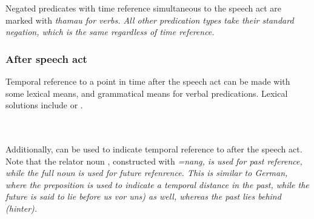 Negated predicates with time reference simultaneous to the speech act are marked with \em thamau\em{} for verbs. All other predication types take their standard negation, which is the same regardless of time reference.




\subsubsection{After speech act}\label{sec:func:Afterspeechact}
Temporal reference to a point in time after the speech act can be made with some lexical means, and grammatical means for verbal predications. Lexical solutions include  or .

 \\
 \\

Additionally,  can be used to indicate temporal reference to after the speech act. Note that the relator noun , constructed with \em =nang\em, is used for past reference, while the full noun   is used for future refenrence. This is similar to German, where the preposition  is used to indicate a temporal distance in the past, while the future is said to lie before us \em vor uns\em) as well, whereas the past lies behind (\em hinter\em).




